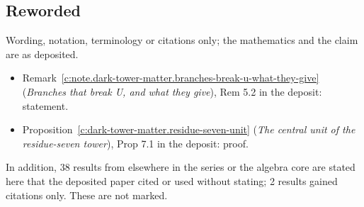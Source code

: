 \documentclass[11pt]{article}
\theoremstyle{definition}
\theoremstyle{plain}
\begin{document}
\subsection*{Reworded}
Wording, notation, terminology or citations only; the mathematics and the claim are as deposited.
\begin{itemize}\setlength{\itemsep}{2pt}
\item Remark~\ref{c:note.dark-tower-matter.branches-break-u-what-they-give} (\emph{Branches that break U, and what they give}), Rem 5.2 in the deposit: statement.
\item Proposition~\ref{c:dark-tower-matter.residue-seven-unit} (\emph{The central unit of the residue-seven tower}), Prop 7.1 in the deposit: proof.
\end{itemize}
\noindent In addition, 38 results from elsewhere in the series or the algebra core are stated here that the deposited paper cited or used without stating; 2 results gained citations only. These are not marked.
\end{document}
